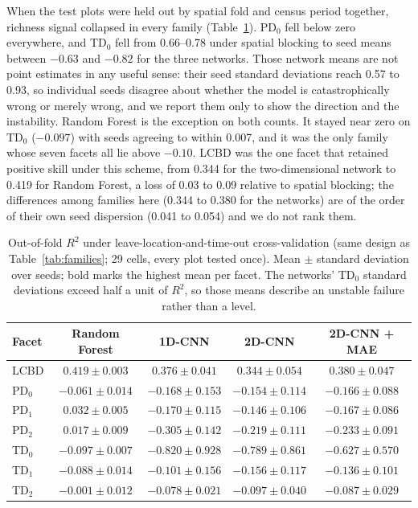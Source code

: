 \documentclass[preprint,12pt]{elsarticle}
\begin{document}
When the test plots were held out by spatial fold and census period together, richness
signal collapsed in every family (Table~\ref{tab:llto}). PD$_0$ fell below zero everywhere,
and TD$_0$ fell from 0.66--0.78 under spatial blocking to seed means between $-0.63$ and
$-0.82$ for the three networks. Those network means are not point estimates in any useful
sense: their seed standard deviations reach 0.57 to 0.93, so individual seeds disagree about
whether the model is catastrophically wrong or merely wrong, and we report them only to show
the direction and the instability. Random Forest is the exception on both counts. It stayed
near zero on TD$_0$ ($-0.097$) with seeds agreeing to within 0.007, and it was the only
family whose seven facets all lie above $-0.10$. LCBD was the one facet that retained
positive skill under this scheme, from 0.344 for the two-dimensional network to 0.419 for
Random Forest, a loss of 0.03 to 0.09 relative to spatial blocking; the differences among
families here (0.344 to 0.380 for the networks) are of the order of their own seed
dispersion (0.041 to 0.054) and we do not rank them.

\begin{table}[t]
\centering
\small
\caption{Out-of-fold $R^2$ under leave-location-and-time-out cross-validation (same design
as Table~\ref{tab:families}; 29 cells, every plot tested once). Mean $\pm$ standard
deviation over seeds; bold marks the highest mean per facet. The networks' TD$_0$ standard
deviations exceed half a unit of $R^2$, so those means describe an unstable failure rather
than a level.}
\label{tab:llto}
\begin{tabular}{lcccc}
\toprule
Facet & Random Forest & 1D-CNN & 2D-CNN & 2D-CNN + MAE \\
\midrule
LCBD   & $\mathbf{0.419\pm0.003}$ & $0.376\pm0.041$ & $0.344\pm0.054$ & $0.380\pm0.047$ \\
PD$_0$ & $\mathbf{-0.061\pm0.014}$ & $-0.168\pm0.153$ & $-0.154\pm0.114$ & $-0.166\pm0.088$ \\
PD$_1$ & $\mathbf{0.032\pm0.005}$ & $-0.170\pm0.115$ & $-0.146\pm0.106$ & $-0.167\pm0.086$ \\
PD$_2$ & $\mathbf{0.017\pm0.009}$ & $-0.305\pm0.142$ & $-0.219\pm0.111$ & $-0.233\pm0.091$ \\
TD$_0$ & $\mathbf{-0.097\pm0.007}$ & $-0.820\pm0.928$ & $-0.789\pm0.861$ & $-0.627\pm0.570$ \\
TD$_1$ & $\mathbf{-0.088\pm0.014}$ & $-0.101\pm0.156$ & $-0.156\pm0.117$ & $-0.136\pm0.101$ \\
TD$_2$ & $\mathbf{-0.001\pm0.012}$ & $-0.078\pm0.021$ & $-0.097\pm0.040$ & $-0.087\pm0.029$ \\
\bottomrule
\end{tabular}
\end{table}
\end{document}
